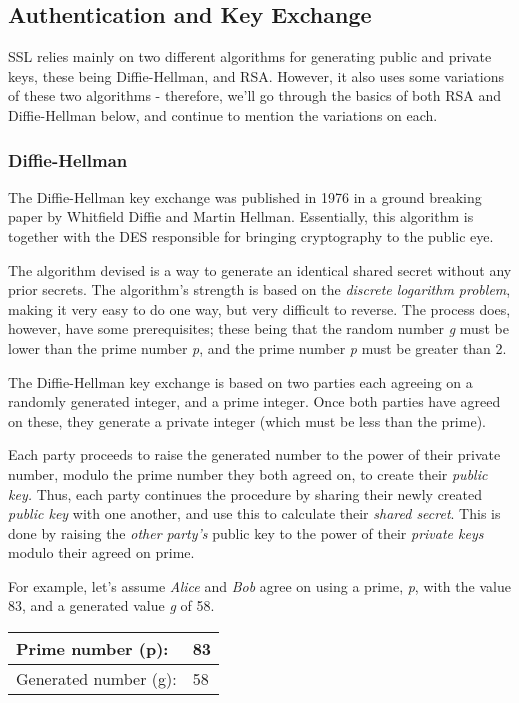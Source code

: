 \bigskip

\subsection{Authentication and Key Exchange}
SSL relies mainly on two different algorithms for generating public and private keys, these being Diffie-Hellman, and RSA. However, it also uses some variations of these two algorithms - therefore, we'll go through the basics of both RSA and Diffie-Hellman below, and continue to mention the variations on each.

\subsubsection[Diffie-Hellman]{Diffie-Hellman}
The Diffie-Hellman key exchange was published in 1976 in a ground breaking paper by Whitfield Diffie and Martin Hellman. Essentially, this algorithm is together with the DES responsible for bringing cryptography to the public eye.

The algorithm devised is a way to generate an identical shared secret without any prior secrets. The algorithm's strength is based on the \textit{discrete logarithm problem}, making it very easy to do one way, but very difficult to reverse. The process does, however, have some prerequisites; these being that the random number \textit{g} must be lower than the prime number \textit{p}, and the prime number \textit{p} must be greater than 2.

The Diffie-Hellman key exchange is based on two parties each agreeing on a randomly generated integer, and a prime integer. Once both parties have agreed on these, they generate a private integer (which must be less than the prime). 

Each party proceeds to raise the generated number to the power of their private number, modulo the prime number they both agreed on, to create their \textit{public key. }Thus, each party continues the procedure by sharing their newly created \textit{public key }with one another, and use this to calculate their \textit{shared secret}. This is done by raising the \textit{other party's }public key to the power of their \textit{private keys }modulo their agreed on prime.

For example, let's assume \textit{Alice }and \textit{Bob} agree on using a prime, \textit{p}, with the value 83, and a generated value \textit{g} of 58.


\begin{center}
\tablehead{}
\begin{supertabular}{|m{3in}|m{3in}|}
\hline
Prime number (p):  & 83\\\hline
Generated number (g):  & 58\\\hline
\end{supertabular}
\end{center}

